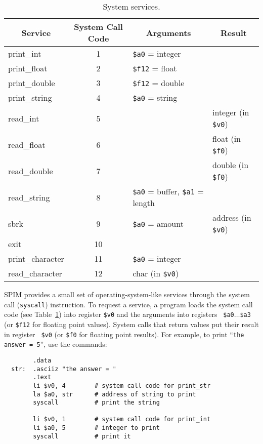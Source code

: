 \begin{table}
  \small
  \begin{center}
  \begin{tabular}{|l|c|l|l|}
    \hline
     \multicolumn{1}{|c|}{\bf Service} &
	{\bf System Call Code} &
	\multicolumn{1}{|c|}{\bf Arguments} &
	\multicolumn{1}{|c|}{\bf Result} \\
     \hline
     \hline
      print\_int & 1 & {\tt \$a0} = integer & \\
      print\_float & 2 & {\tt \$f12} = float & \\
      print\_double & 3 & {\tt \$f12} = double & \\
      print\_string & 4 & {\tt \$a0} = string & \\
      read\_int & 5 & & integer (in {\tt \$v0}) \\
      read\_float & 6 & & float (in {\tt \$f0}) \\
      read\_double & 7 & & double (in {\tt \$f0}) \\
      read\_string & 8 & {\tt \$a0} = buffer, {\tt \$a1} = length & \\
      sbrk & 9 & {\tt \$a0} = amount & address (in {\tt \$v0}) \\
      exit & 10 & & \\
      print\_character & 11 & {\tt \$a0} = integer & \\
      read\_character & 12 & char (in {\tt \$v0}) \\
     \hline
  \end{tabular}
  \end{center}
  \caption{System services.}
  \label{tab:syscall}
\end{table}
SPIM provides a small set of operating-system-like services through
the system call ({\tt syscall}) instruction.  To request a service, a
program loads the system call code (see Table~\ref{tab:syscall}) into
register {\tt \$v0} and the arguments into registers {\tt
\$a0}$\ldots${\tt \$a3} (or {\tt \$f12} for floating point values).
System calls that return values put their result in register {\tt
\$v0} (or {\tt \$f0} for floating point results).  For example, to
print ``{\tt the answer = 5}'', use the commands:
\begin{verbatim}
        .data
  str:  .asciiz "the answer = "
        .text
        li $v0, 4        # system call code for print_str
        la $a0, str      # address of string to print
        syscall          # print the string

        li $v0, 1        # system call code for print_int
        li $a0, 5        # integer to print
        syscall          # print it
\end{verbatim}

